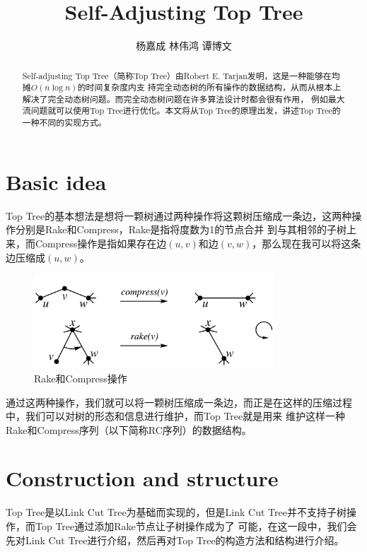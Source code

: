 ﻿\documentclass{article}
\newcommand{\kai}{\CJKfamily{KaiTi}}
\begin{document}
    \title{\textbf{Self-Adjusting Top Tree}}
    \author{杨嘉成\,\,林伟鸿\,\,谭博文}
    \maketitle
	\begin{abstract}\kai
		Self-adjusting Top Tree（简称Top Tree）由Robert E. Tarjan\cite{ref1}发明，这是一种能够在均摊$O(n\log n)$的时间复杂度内支
	持完全动态树的所有操作的数据结构\cite{ref2}，从而从根本上解决了完全动态树问题。而完全动态树问题在许多算法设计时都会很有作用，
	例如最大流问题就可以使用Top Tree进行优化。本文将从Top Tree的原理出发，讲述Top Tree的一种不同的实现方式。
	\end{abstract}
	\tableofcontents
    \newpage
	\section{Basic idea}
	\indent Top Tree的基本想法是想将一颗树通过两种操作将这颗树压缩成一条边，这两种操作分别是Rake和Compress，Rake是指将度数为1的节点合并
	到与其相邻的子树上来，而Compress操作是指如果存在边$(u, v)$和边$(v, w)$，那么现在我可以将这条边压缩成$(u, w)$。\par
	\begin{figure}[!htbp]
		\centering
		\includegraphics[width=9.0cm]{basicOperations.jpg}
		\caption{Rake和Compress操作}
	\end{figure}
	通过这两种操作，我们就可以将一颗树压缩成一条边，而正是在这样的压缩过程中，我们可以对树的形态和信息进行维护，而Top Tree就是用来
	维护这样一种Rake和Compress序列（以下简称RC序列）的数据结构。\par 
	\section{Construction and structure}
		\indent Top Tree是以Link Cut Tree为基础而实现的，但是Link Cut Tree并不支持子树操作，而Top Tree通过添加Rake节点让子树操作成为了
		可能，在这一段中，我们会先对Link Cut Tree进行介绍，然后再对Top Tree的构造方法和结构进行介绍。
\end{document}

